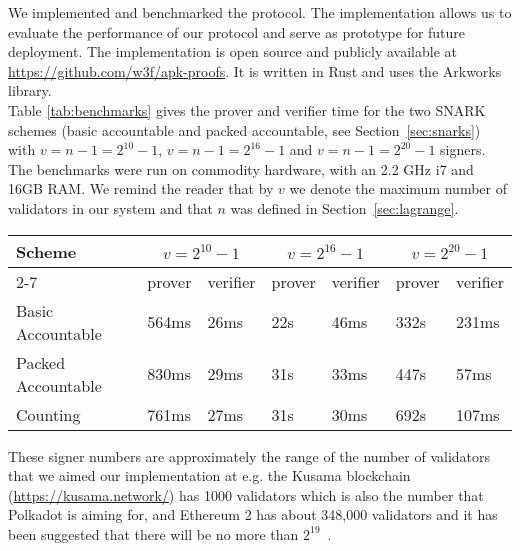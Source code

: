 \noindent We implemented and benchmarked the protocol. The implementation allows us to evaluate the performance of our protocol and serve as prototype for future deployment. The implementation 
is open source and publicly available at \url{https://github.com/w3f/apk-proofs}. It is written in Rust and uses the Arkworks library. \\

\noindent Table \ref{tab:benchmarks} gives the prover and verifier time for the two SNARK schemes (basic accountable and  packed accountable, see Section~\ref{sec:snarks}) with $v = n-1 = 2^{10}-1$, $v = n-1 = 2^{16}-1$ 
and $v=n-1=2^{20}-1$ signers. The benchmarks were run on commodity hardware, with an 2.2 GHz i7 and 16GB RAM. We remind the reader that by $v$ we denote the maximum number of validators in our system and that $n$ was defined in Section~\ref{sec:lagrange}.\\

\begin{table*}[h!]
\hfill
\begin{tabular}{| l | l | l | l | l |l | l |}
\hline
 Scheme & \multicolumn{2}{|c|}{$v = 2^{10}-1$} & \multicolumn{2}{|c|}{$v = 2^{16}-1$} & \multicolumn{2}{|c|}{$v = 2^{20}-1$}     \\
\cline{2-7}
 &  prover & verifier & prover & verifier &  prover & verifier \\
\hline

Basic Accountable & 564ms & 26ms & 22s & 46ms & 332s & 231ms \\
Packed Accountable & 830ms & 29ms & 31s & 33ms & 447s & 57ms \\
Counting            & 761ms & 27ms & 31s & 30ms & 692s & 107ms \\
\hline
\end{tabular}
\caption{Proof and verifier times for the different schemes and numbers of signers}
\label{tab:benchmarks}
\end{table*}


\noindent These signer numbers are approximately the range of the number of validators that we aimed our implementation at e.g. the Kusama blockchain (\url{https://kusama.network/}) has 1000 validators which is also the number that Polkadot is aiming for, and Ethereum 2 has about 348,000 validators and it has been suggested that there will be no more than $2^{19}$~\cite{ethresearch1}. \\

